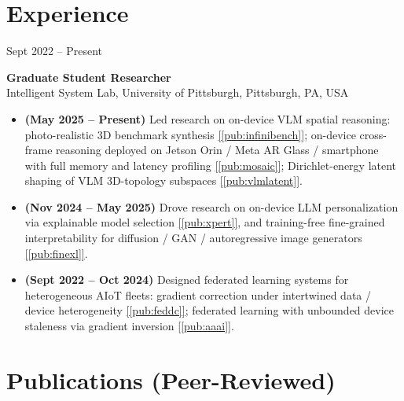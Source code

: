 \documentclass[11pt, letterpaper]{article}
\newenvironment{datedentry}[1]{%
  \par\noindent
  \begin{minipage}[t]{2.8cm}\raggedright\small #1\end{minipage}%
  \hspace{0.3cm}%
  \begin{minipage}[t]{\dimexpr\linewidth-3.1cm\relax}\raggedright
}{\end{minipage}\par\medskip}
\newcommand{\citeref}[1]{\hyperref[#1]{[\ref*{#1}]}}
\begin{document}
\section{Experience}

\begin{datedentry}{Sept 2022 -- Present}
\textbf{Graduate Student Researcher}\\
Intelligent System Lab, University of Pittsburgh, Pittsburgh, PA, USA
\begin{itemize}[leftmargin=1.1em, itemsep=2pt, topsep=3pt]
  \item \textbf{(May 2025 -- Present)} Led research on on-device VLM spatial reasoning: photo-realistic 3D benchmark synthesis \citeref{pub:infinibench}; on-device cross-frame reasoning deployed on Jetson Orin / Meta AR Glass / smartphone with full memory and latency profiling \citeref{pub:mosaic}; Dirichlet-energy latent shaping of VLM 3D-topology subspaces \citeref{pub:vlmlatent}.
  \item \textbf{(Nov 2024 -- May 2025)} Drove research on on-device LLM personalization via explainable model selection \citeref{pub:xpert}, and training-free fine-grained interpretability for diffusion / GAN / autoregressive image generators \citeref{pub:finexl}.
  \item \textbf{(Sept 2022 -- Oct 2024)} Designed federated learning systems for heterogeneous AIoT fleets: gradient correction under intertwined data / device heterogeneity \citeref{pub:feddc}; federated learning with unbounded device staleness via gradient inversion \citeref{pub:aaai}.
\end{itemize}
\end{datedentry}

\section{Publications (Peer-Reviewed)}
\end{document}
